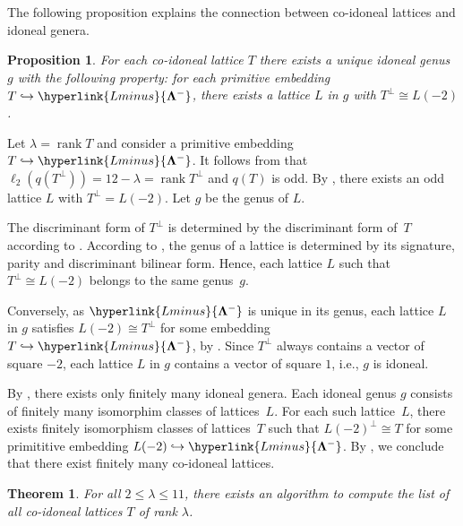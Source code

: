 \documentclass[a4paper]{amsart}
\theoremstyle{definition}
\theoremstyle{plain}
\newtheorem{theorem}[definition]{Theorem}
\newtheorem{proposition}[definition]{Proposition}
\DeclareMathOperator{\rank}{rank}
\newcommand{\bLambda}{\mathbf{\Lambda}}
\newcommand{\Lminus}{\hyperlink{Lminus}{\bLambda^-}}
\begin{document}
The following proposition explains the connection between co-idoneal lattices and idoneal genera.

\begin{proposition} \label{prop:co-idoneal.lattices/idoneal.genera}
For each co-idoneal lattice \(T\) there exists a unique idoneal genus~\(g\) with the following property: for each primitive embedding \(T \hookrightarrow \Lminus\), there exists a lattice \(L\) in \(g\) with \(T^\perp \cong L(-2)\).
\end{proposition}
\proof
Let \(\lambda = \rank T\) and consider a primitive embedding \(T \hookrightarrow \Lminus\). 
It follows from  that \(\ell_2(q(T^\perp)) = 12 - \lambda = \rank T^\perp\) and \(q(T)\) is odd. 
By , there exists an odd lattice \(L\) with \(T^\perp = L(-2)\). Let \(g\) be the genus of \(L\).

The discriminant form of \(T^\perp\) is determined by the discriminant form of~\(T\) according to . 
According to \cite[Corollary~1.16.3]{Nikulin:int.sym.bilinear.forms}, the genus of a lattice is determined by its signature, parity and discriminant bilinear form. Hence, each lattice \(L\) such that \(T^\perp \cong L(-2)\) belongs to the same genus~\(g\). 

Conversely, as \(\Lminus\) is unique in its genus, each lattice \(L\) in \(g\) satisfies \(L(-2) \cong T^\perp\) for some embedding \(T \hookrightarrow \Lminus\), by .
Since \(T^\perp\) always contains a vector of square \(-2\), each lattice \(L\) in \(g\) contains a vector of square \(1\), i.e., \(g\) is idoneal.
\endproof


By , there exists only finitely many idoneal genera. Each idoneal genus \(g\) consists of finitely many isomorphim classes of lattices~\(L\). For each such lattice~\(L\), there exists finitely isomorphism classes of lattices~\(T\) such that \(L(-2)^\perp \cong T\) for some primititive embedding \(L(-2) \hookrightarrow \Lminus\). By , we conclude that there exist finitely many co-idoneal lattices.
\endproof 

\begin{theorem} \label{thm:algorithm.co-idoneal}
    For all \(2 \leq \lambda \leq 11\), there exists an algorithm to compute the list of all co-idoneal lattices \(T\) of rank \(\lambda\).
\end{theorem}
\end{document}
